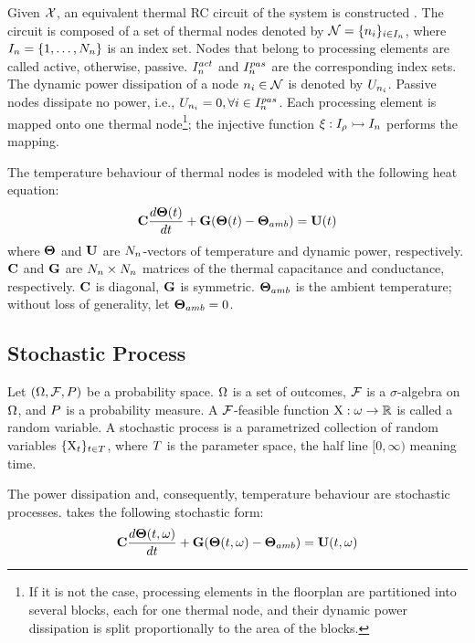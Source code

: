 Given $\mathcal{X}$, an equivalent thermal RC circuit of the system is constructed \cite{kreith2000}. The circuit is composed of a set of thermal nodes denoted by $\mathcal{N} = \{ n_i \}_{i \in I_n}$, where $I_n = \{ 1, \dots, N_n \}$ is an index set. Nodes that belong to processing elements are called active, otherwise, passive. $I^{act}_n$ and $I^{pas}_n$ are the corresponding index sets. The dynamic power dissipation of a node $n_i \in \mathcal{N}$ is denoted by $U_{n_i}$. Passive nodes dissipate no power, i.e., $U_{n_i} = 0, \forall i \in I^{pas}_n$. Each processing element is mapped onto one thermal node\footnote{If it is not the case, processing elements in the floorplan are partitioned into several blocks, each for one thermal node, and their dynamic power dissipation is split proportionally to the area of the blocks.}; the injective function $\xi: I_\rho \rightarrowtail I_n$ performs the mapping.

The temperature behaviour of thermal nodes is modeled with the following heat equation:
\begin{equation} \equlabel{fourier}
  \mcapacitance \frac{d\vtemperature(\time)}{d\time} + \mconductance (\vtemperature(\time) - \vtemperature_{amb}) = \vpower(\time)
\end{equation}
where $\mathbf{\Theta}$ and $\mathbf{U}$ are $N_n$-vectors of temperature and dynamic power, respectively. $\mathbf{C}$ and $\mathbf{G}$ are $N_n \times N_n$ matrices of the thermal capacitance and conductance, respectively. $\mathbf{C}$ is diagonal, $\mathbf{G}$ is symmetric. $\mathbf{\Theta}_{amb}$ is the ambient temperature; without loss of generality, let $\mathbf{\Theta}_{amb} = 0$.

\subsection{Stochastic Process}
Let $(\Omega, \mathcal{F}, P)$ be a probability space. $\Omega$ is a set of outcomes, $\mathcal{F}$ is a $\sigma$-algebra on $\Omega$, and $P$ is a probability measure. A $\mathcal{F}$-feasible function $\textrm{X}: \omega \to \mathbb{R}$ is called a random variable. A stochastic process is a parametrized collection of random variables $\{ \textrm{X}_t \}_{t \in T}$, where $T$ is the parameter space, the half line $[0, \infty)$ meaning time.

The power dissipation and, consequently, temperature behaviour are stochastic processes.  takes the following stochastic form:
\begin{equation} \equlabel{stochastic-fourier}
  \mcapacitance \frac{d\svtemperature(\time, \outcome)}{d\time} + \mconductance (\svtemperature(\time, \outcome) - \vtemperature_{amb}) = \svpower(\time, \outcome)
\end{equation}
